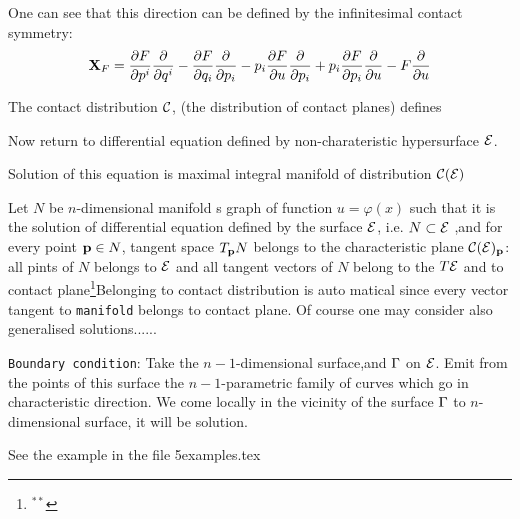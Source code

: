      One can see that this direction can be defined by the
infinitesimal contact symmetry:
     $$
{\bf X}_F=
{\partial F\over \partial p^i}{\partial\over \partial q^i}
            -
{\partial F\over \partial q_i}{\partial\over \partial p_i}
              -
p_i{\partial F\over \partial u}{\partial\over \partial p_i}
              +
p_i{\partial F\over \partial p_i}{\partial\over \partial u}
              -
F{\partial\over \partial u}
      $$
  
The contact distribution ${\cal C}$,  (the distribution of contact planes)
defines 

Now return to differential equation defined
by non-charateristic hypersurface ${\cal E}$.

Solution of this equation is maximal integral manifold
of distribution ${\cal C}({\cal E})$

Let $N$ be $n$-dimensional manifold s graph of function
   $u=\varphi(x)$ such that it is  
the solution of differential equation defined by the surface ${\cal E}$,
i.e. $N\subset {\cal E}$ ,and for every point ${\bf p}\in N$, 
tangent space $T_{\bf p} N$ belongs
to the characteristic plane ${\cal C}({\cal E})_{\bf p}$: all pints of $N$
belongs to ${\cal E}$ and all tangent vectors
of  $N$  belong to the $T{\cal E}$ and to contact plane\footnote
{$^{**}$}{Belonging to contact distribution is auto  
matical since every vector tangent to {\tt manifold}
belongs to contact plane}.
Of course one may consider also generalised solutions......

{\tt Boundary condition}: Take the $n-1$-dimensional surface,and
${\Gamma}$ on ${\cal E}$.  Emit from the points of this surface the 
$n-1$-parametric family of curves which go in characteristic direction. 
We come locally in the vicinity of the surface ${\Gamma}$ to $n$-dimensional
surface, it will be solution.

See the example in the file 5examples.tex

\m


\bye
